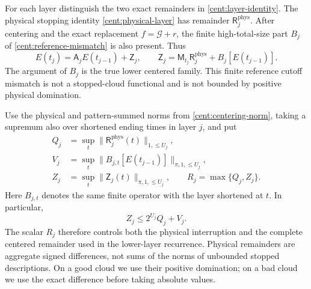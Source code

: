 For each layer distinguish the two exact remainders in
\eqref{cent:layer-identity}. The physical stopping identity
\eqref{cent:physical-layer} has remainder
$\mathsf R_j^{\mathrm{phys}}$. After centering and the exact
replacement $f=\mathscr G+r$, the finite high-total-size part
$B_j$ of \eqref{cent:reference-mismatch} is also present. Thus
\begin{equation}\label{close:centered-remainder}
 E(t_j)=\mathsf A_jE(t_{j-1})+\mathsf Z_j,\qquad
 \mathsf Z_j=
 \mathsf M_{t_j}\mathsf R_j^{\mathrm{phys}}
       +B_j[E(t_{j-1})].
\end{equation}
The argument of $B_j$ is the true lower centered family.
This finite reference cutoff mismatch is not a stopped-cloud
functional and is not bounded by positive physical domination.

Use the physical and pattern-summed norms from
\eqref{cent:centering-norm}, taking a supremum also over shortened
ending times in layer $j$, and put
\begin{equation}\label{close:remainder-norms}
 \begin{split}
 Q_j&=\sup_t\|\mathsf R_j^{\mathrm{phys}}(t)\|_{1,\leq U_j},\\
 V_j&=\sup_t\|B_{j,t}[E(t_{j-1})]\|_{\pi,1,\leq U_j},\\
 Z_j&=\sup_t\|\mathsf Z_j(t)\|_{\pi,1,\leq U_j},\qquad
 R_j=\max\{Q_j,Z_j\}.
 \end{split}
\end{equation}
Here $B_{j,t}$ denotes the same finite operator with the layer
shortened at $t$. In particular,
\begin{equation}\label{close:centering-remainder-norm}
 Z_j\leq2^{U_j}Q_j+V_j.
\end{equation}
The scalar $R_j$ therefore controls both the physical interruption
and the complete centered remainder used in the lower-layer
recurrence. Physical remainders are aggregate signed differences,
not sums of the norms of unbounded stopped descriptions. On a
good cloud we use their positive domination; on a bad cloud we
use the exact difference before taking absolute values.

